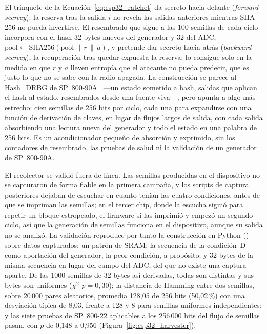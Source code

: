 El trinquete de la Ecuación~\eqref{eq:esp32_ratchet} da secreto hacia
delante (\emph{forward secrecy}): la reserva tras la salida $i$ no revela
las salidas anteriores mientras SHA-256 no pueda invertirse. El resembrado
que sigue a las 100 semillas de cada ciclo incorpora con el hash 32 bytes
nuevos del generador y 32 del ADC,
$\mathrm{pool} \leftarrow \mathrm{SHA256}(\mathrm{pool} \,\|\, r \,\|\, a)$,
y pretende dar secreto hacia atrás (\emph{backward secrecy}), la
recuperación tras quedar expuesta la reserva; lo consigue solo en la
medida en que $r$ y $a$ lleven entropía que el atacante no pueda
predecir, que es justo lo que no se sabe con la radio apagada. La
construcción se parece al Hash\_DRBG de
SP~800-90A~\cite{barker_2015_sp80090ar1} ---un estado sometido a hash,
salidas que aplican el hash al estado, resembrados desde una fuente
viva---, pero apunta a algo más estrecho: cien semillas de 256 bits por
ciclo, cada una para expandirse con una función de derivación de claves,
en lugar de flujos largos de salida, con cada salida absorbiendo una
lectura nueva del generador y todo el estado en una palabra de 256 bits.
Es un acondicionador pequeño de absorción y exprimido, sin los contadores
de resembrado, las pruebas de salud ni la validación de un generador de
SP~800-90A.

El recolector se validó fuera de línea. Las semillas producidas en el
dispositivo no se capturaron de forma fiable en la primera campaña, y los
scripts de captura posteriores dejaban de escuchar en cuanto tenían las
cuatro condiciones, antes de que se impriman las semillas; en el tercer
chip, donde la escucha siguió para repetir un bloque estropeado, el
firmware sí las imprimió y empezó un segundo ciclo, así que la generación
de semillas funciona en el dispositivo, aunque su salida no se analizó. La validación reproduce por tanto la construcción
en Python () sobre
datos capturados: un patrón de SRAM; la secuencia de la condición~D como
aportación del generador, la peor condición, a propósito; y 32 bytes de
la misma secuencia en lugar del campo del ADC, del que no existe una
captura aparte. De las 1000 semillas de 32 bytes así derivadas, todas son
distintas y sus bytes son uniformes ($\chi^2$ $p = 0{,}30$); la distancia
de Hamming entre dos semillas, sobre 20\,000 pares aleatorios, promedia
128,05 de 256 bits (50,02\,\%) con una desviación típica de 8,03, frente a
128 y 8 para semillas uniformes independientes; y las siete pruebas de
SP~800-22 aplicables a los 256\,000 bits del flujo de semillas pasan, con
$p$ de 0,148 a 0,956 (Figura~\ref{fig:esp32_harvester}).

